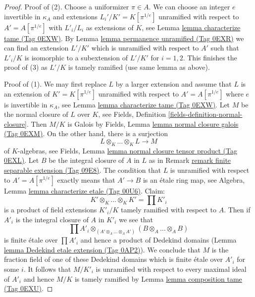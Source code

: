 \documentclass{amsart}
\theoremstyle{plain}
\theoremstyle{definition}
\theoremstyle{remark}
\numberwithin{equation}{subsection}
\begin{document}
\begin{proof}
Proof of (2). Choose a uniformizer $\pi \in A$.
We can choose an integer $e$ invertible
in $\kappa_A$ and extensions $L_i'/K' = K[\pi^{1/e}]$
unramified with respect to $A' = A[\pi^{1/e}]$
with $L'_i/L_i$ as extensions of $K$, see
Lemma \href{https://stacks.math.columbia.edu/tag/0EXW}{lemma characterize tame (Tag 0EXW)}.
By Lemma \href{https://stacks.math.columbia.edu/tag/0EXR}{lemma permanence unramified (Tag 0EXR)}
we can find an extension $L'/K'$ which is unramified
with respect to $A'$ such that $L'_i/K$ is isomorphic
to a subextension of $L'/K'$ for $i = 1, 2$.
This finishes the proof of (3) as $L'/K$ is tamely ramified
(use same lemma as above).

\medskip\noindent
Proof of (1). We may first replace $L$ by a larger extension
and assume that $L$ is an extension of $K' = K[\pi^{1/e}]$
unramified with respect to $A' = A[\pi^{1/e}]$ where $e$ is
invertible in $\kappa_A$, see Lemma \href{https://stacks.math.columbia.edu/tag/0EXW}{lemma characterize tame (Tag 0EXW)}.
Let $M$ be the normal closure of $L$ over $K$, see
Fields, Definition \ref{fields-definition-normal-closure}.
Then $M/K$ is Galois by Fields, Lemma \href{https://stacks.math.columbia.edu/tag/0EXM}{lemma normal closure galois (Tag 0EXM)}.
On the other hand, there is a surjection
$$
L \otimes_K \ldots \otimes_K L \longrightarrow M
$$
of $K$-algebras, see Fields, Lemma
\href{https://stacks.math.columbia.edu/tag/0EXL}{lemma normal closure tensor product (Tag 0EXL)}.
Let $B$ be the integral closure of $A$ in $L$
as in Remark \href{https://stacks.math.columbia.edu/tag/09E8}{remark finite separable extension (Tag 09E8)}. The
condition that $L$ is unramified with respect to $A' = A[\pi^{1/e}]$
exactly means that $A' \to B$ is an \'etale ring map, see
Algebra, Lemma \href{https://stacks.math.columbia.edu/tag/00U6}{lemma characterize etale (Tag 00U6)}.
Claim: 
$$
K' \otimes_K \ldots \otimes_K K' = \prod K'_i
$$
is a product of field extensions $K'_i/K$ tamely
ramified with respect to $A$. Then if $A'_i$ is the integral
closure of $A$ in $K'_i$ we see that
$$
\prod A'_i \otimes_{(A' \otimes_A \ldots \otimes_A A')}
(B \otimes_A \ldots \otimes_A B)
$$
is finite \'etale over $\prod A'_i$ and hence a product of
Dedekind domains (Lemma \href{https://stacks.math.columbia.edu/tag/0AP2}{lemma Dedekind etale extension (Tag 0AP2)}).
We conclude that $M$ is the fraction field
of one of these Dedekind domains which is finite \'etale
over $A'_i$ for some $i$. It follows that $M/K'_i$
is unramified with respect to every maximal ideal of $A'_i$
and hence $M/K$ is tamely ramified by Lemma \href{https://stacks.math.columbia.edu/tag/0EXU}{lemma composition tame (Tag 0EXU)}.


\end{proof}
\end{document}
